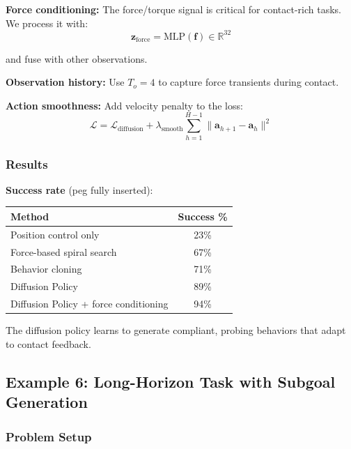 \textbf{Force conditioning:} The force/torque signal is critical for contact-rich tasks. We process it with:
\begin{equation}
\mathbf{z}_{\text{force}} = \text{MLP}(\mathbf{f}) \in \mathbb{R}^{32}
\label{eq:force_embedding}
\end{equation}

and fuse with other observations.

\textbf{Observation history:} Use $T_o = 4$ to capture force transients during contact.

\textbf{Action smoothness:} Add velocity penalty to the loss:
\begin{equation}
\mathcal{L} = \mathcal{L}_{\text{diffusion}} + \lambda_{\text{smooth}} \sum_{h=1}^{H-1} \|\mathbf{a}_{h+1} - \mathbf{a}_h\|^2
\label{eq:smoothness_loss}
\end{equation}

\subsubsection{Results}

\textbf{Success rate} (peg fully inserted):
\begin{center}
\begin{tabular}{lc}
\toprule
\textbf{Method} & \textbf{Success \%} \\
\midrule
Position control only & 23\% \\
Force-based spiral search & 67\% \\
Behavior cloning & 71\% \\
Diffusion Policy & 89\% \\
Diffusion Policy + force conditioning & 94\% \\
\bottomrule
\end{tabular}
\end{center}

The diffusion policy learns to generate compliant, probing behaviors that adapt to contact feedback.

\subsection{Example 6: Long-Horizon Task with Subgoal Generation}
\label{subsec:example_long_horizon}

\subsubsection{Problem Setup}

